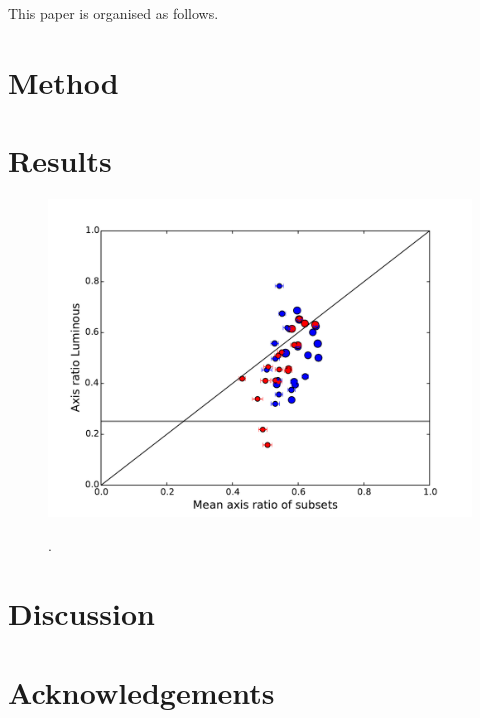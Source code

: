 \documentclass[useAMS,usenatbib]{mn2e}
\begin{document}
This paper is organised as follows. 

\section{Method}
\label{Method}


\section{Results}
\label{Results}
\begin{figure}
\centering
\includegraphics[width=\hsize]{AxisRatio_RandomMean_VS_Luminous.pdf}\\
\caption{.}
\label{fig:StreamPlaneOrbit}
\end{figure}


\section{Discussion} 
\section{Acknowledgements}





\label{lastpage}
\end{document}
